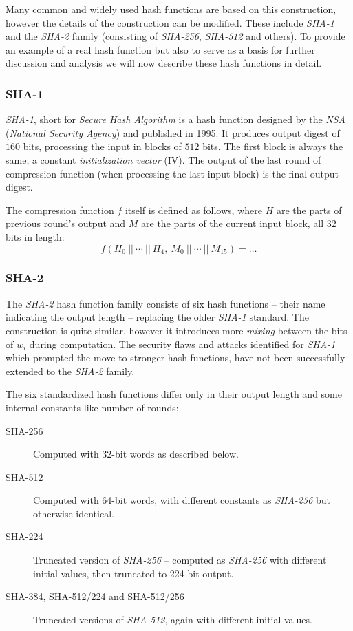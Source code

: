 Many common and widely used hash functions are based on this construction, however the details of the construction can be modified.
These include \emph{SHA-1} and the \emph{SHA-2} family (consisting of \emph{SHA-256}, \emph{SHA-512} and others).
To provide an example of a real hash function but also to serve as a basis for further discussion and analysis we will now describe these hash functions in detail.

\subsubsection{SHA-1}

\emph{SHA-1}, short for \emph{Secure Hash Algorithm} is a hash function designed by the \emph{NSA} (\emph{National Security Agency}) and published in 1995.
It produces output digest of $160$ bits, processing the input in blocks of $512$ bits.
The first block is always the same, a constant \emph{initialization vector} (IV).
The output of the last round of compression function (when processing the last input block) is the final output digest.


The compression function $f$ itself is defined as follows, where $H$ are the parts of previous round's output and $M$ are the parts of
the current input block, all $32$ bits in length:
\[
f(H_0 ~||~ \cdots ~||~ H_4, ~ M_0 ~||~ \cdots ~||~ M_{15}) = \dots
\]

\subsubsection{SHA-2}
The \emph{SHA-2} hash function family consists of six hash functions -- their name indicating the output length -- replacing the older \emph{SHA-1} standard. The construction is quite similar, however it introduces more \emph{mixing} between the bits of $w_i$ during computation. The security flaws and attacks identified for \emph{SHA-1} which prompted the move to stronger hash functions, have not been successfully extended to the \emph{SHA-2} family.

The six standardized hash functions differ only in their output length and some internal constants like number of rounds:
\begin{description}
\item[SHA-256] Computed with 32-bit words as described below.
\item[SHA-512] Computed with 64-bit words, with different constants as \emph{SHA-256} but otherwise identical.
\item[SHA-224] Truncated version of \emph{SHA-256} -- computed as \emph{SHA-256} with different initial values, then truncated to 224-bit output.
\item[SHA-384, SHA-512/224 and SHA-512/256] Truncated versions of \emph{SHA-512}, again with different initial values.
\end{description}

